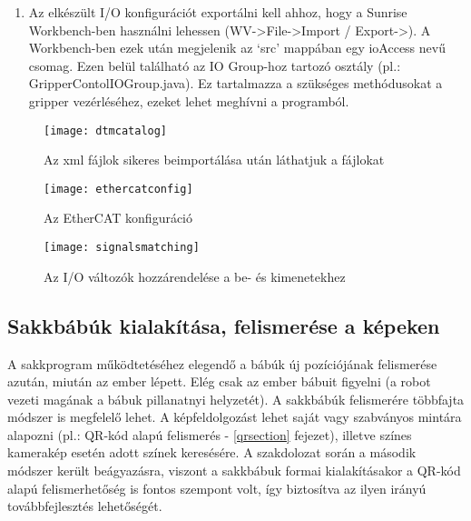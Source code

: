 \documentclass[../documentation.tex]{subfiles}
\begin{document}
\begin{enumerate}
	\begin{itemize}
		\item OpenGripper: bool, output, digital
		\item CloseGripper: bool, output, digital
		\item Status: bool, input, digital
	\end{itemize}
Az egyes változókat a kívánt bemenetekkel és kimenetekkel  módszerrel lehet összerendelni (\ref{fig:signalsmatching}). Megfelelő összekötés esetén a változók mellletti szürke nyilak zölddé változnak.
	\item Az elkészült I/O konfigurációt exportálni kell ahhoz, hogy a Sunrise Workbench-ben használni lehessen (WV->File->Import / Export->). A Workbench-ben ezek után megjelenik az `src' mappában egy ioAccess nevű csomag. Ezen belül található az IO Group-hoz tartozó osztály (pl.: GripperContolIOGroup.java). Ez tartalmazza a szükséges methódusokat a gripper vezérléséhez, ezeket lehet meghívni a programból.
\end{enumerate}

\begin{figure}[p]
\centering
\texttt{[image: dtmcatalog]}
\caption{Az xml fájlok sikeres beimportálása után láthatjuk a  fájlokat}
\label{fig:dtmcatalog}
\end{figure}

\begin{figure}[p]
\centering
\texttt{[image: ethercatconfig]}
\caption{Az EtherCAT konfiguráció}
\label{fig:ethercatconfig}
\end{figure}

\begin{figure}[p]
\centering
\texttt{[image: signalsmatching]}
\caption{Az I/O változók hozzárendelése a be- és kimenetekhez}
\label{fig:signalsmatching}
\end{figure}

\subsection{Sakkbábúk kialakítása, felismerése a képeken}
A sakkprogram működtetéséhez elegendő a bábúk új pozíciójának felismerése azután, miután az ember lépett. Elég csak az ember bábuit figyelni (a robot vezeti magának a bábuk pillanatnyi helyzetét). A sakkbábúk felismerére többfajta módszer is megfelelő lehet. A képfeldolgozást lehet saját vagy szabványos mintára alapozni (pl.: QR-kód alapú felismerés - \ref{qrsection} fejezet), illetve színes kamerakép esetén adott színek keresésére. A szakdolozat során a második módszer került beágyazásra, viszont a sakkbábuk formai kialakításakor a QR-kód alapú felismerhetőség is fontos szempont volt, így biztosítva az ilyen irányú továbbfejlesztés lehetőségét.
\end{document}
